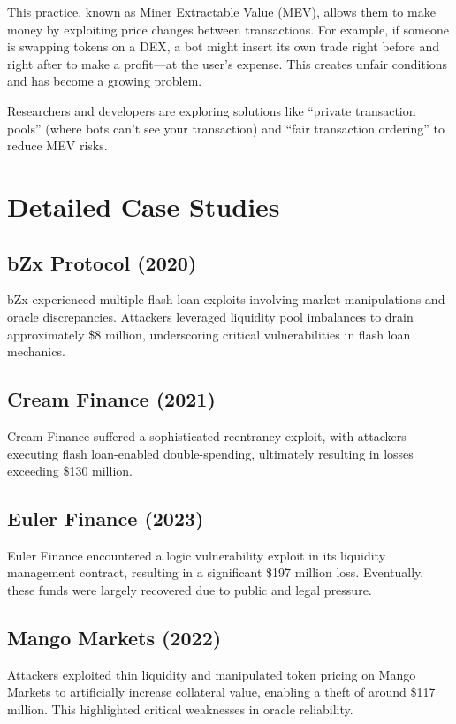 \documentclass[conference]{IEEEtran}
\begin{document}
This practice, known as Miner Extractable Value (MEV), allows them to make money by exploiting price changes between transactions. For example, if someone is swapping tokens on a DEX, a bot might insert its own trade right before and right after to make a profit—at the user's expense. This creates unfair conditions and has become a growing problem.

Researchers and developers are exploring solutions like “private transaction pools” (where bots can't see your transaction) and “fair transaction ordering” to reduce MEV risks.


\section{Detailed Case Studies}

\subsection{bZx Protocol (2020)}
bZx experienced multiple flash loan exploits involving market manipulations and oracle discrepancies. Attackers leveraged liquidity pool imbalances to drain approximately \$8 million, underscoring critical vulnerabilities in flash loan mechanics.

\subsection{Cream Finance (2021)}
Cream Finance suffered a sophisticated reentrancy exploit, with attackers executing flash loan-enabled double-spending, ultimately resulting in losses exceeding \$130 million.

\subsection{Euler Finance (2023)}
Euler Finance encountered a logic vulnerability exploit in its liquidity management contract, resulting in a significant \$197 million loss. Eventually, these funds were largely recovered due to public and legal pressure.

\subsection{Mango Markets (2022)}
Attackers exploited thin liquidity and manipulated token pricing on Mango Markets to artificially increase collateral value, enabling a theft of around \$117 million. This highlighted critical weaknesses in oracle reliability.
\end{document}
